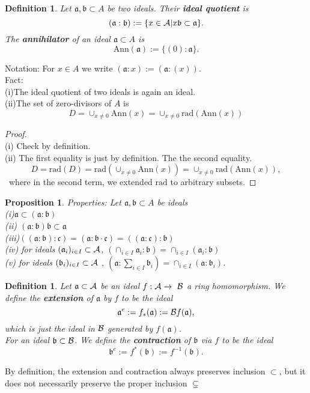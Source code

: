 \documentclass[11pt]{article}
\newtheorem{prop}[thm]{Proposition}
\newtheorem{dfn}[thm]{Definition}
\newcommand{\sca}{{\mathfrak a}}
\newcommand{\scb}{{\mathfrak b}}
\newcommand{\scc}{{\mathfrak c}}
\newcommand{\cala}{{\cal A}}
\newcommand{\calb}{{\cal B}}
\begin{document}
\begin{dfn}
Let $\sca,\scb\subset A$ be two ideals. Their \textbf{ideal quotient} is 
$$
(\sca:\scb):=\{x\in \cala| x\scb \subset \sca\}.
$$ 
The \textbf{annihilator} of an ideal $\sca\subset A $ is 
$$
\text{Ann}(\sca):=\{(0):\sca\}.
$$
\end{dfn}
Notation: For $x\in A$ we write $(\sca:x):=(\sca:(x))$.\\
Fact: \\
(i)The ideal quotient of two ideals is again an ideal.\\
(ii)The set of zero-divisors  of $A$ is 
$$
D=\cup_{x\neq 0} \text{Ann}(x)=\cup_{x\neq 0}\text{rad}(\text{Ann}(x))
$$
\begin{proof}\ \\
(i) Check by definition.\\
(ii) The first equality is just by definition. The the second equality.
$$
D=\text{rad}(D)=\text{rad}(\cup_{x\neq 0}\text{Ann}(x))=\cup_{x\neq 0}\text{rad}(\text{Ann}(x)),
$$
 where in the second term, we extended $\text{rad}$ to arbitrary subsets.
\end{proof}
\begin{prop}
Properties: Let $\sca, \scb\subset A$ be ideals \\
(i)$\sca\subset (\sca:\scb)$\\
(ii) $(\sca:\scb)\scb\subset \sca$\\
(iii)$((\sca:\scb):\scc)=(\sca:\scb\cdot\scc)=((\sca:\scc):\scb)$\\
(iv) for ideals $(\sca_i)_{i\in I}\subset \cala$, $(\cap_{i\in I}\sca_i:\scb)=\cap_{i\in I}(\sca_i:\scb)$\\
(v) for ideals $(\scb_i)_{i\in I}\subset\cala$ , $(\sca:\sum_{i\in I }\scb_i)=\cap_{i\in I} (\sca:\scb_i)$.\\
\end{prop}
\begin{dfn}\label{def:extention_contraction}
Let $\sca\subset \cala$ be an ideal $f: \cala\rightarrow  \calb$ a ring homomorphism. We define the \textbf{extension} of $\sca$ by $f$ to be the ideal 
$$
\sca^e:=f_{*}(\sca):=\calb f(\sca),
$$
which is just the ideal in $\calb$ generated by $f(\sca)$.\\
For an ideal $\scb\subset \calb$. We define the \textbf{contraction} of $\scb$ via $f$ to be the ideal 
$$
\scb^c:=f^*(\scb):=f^{-1}(\scb).
$$
\end{dfn}
{\color{red} By definition, the extension and contraction always preserves inclusion $\subset$, but it does not necessarily preserve the proper inclusion $\subsetneq$}
\end{document}
